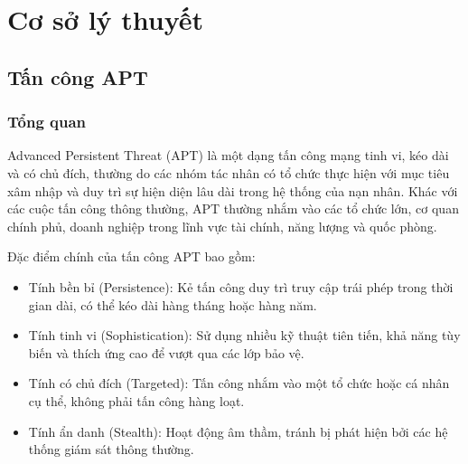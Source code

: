 \pagebreak

\chapter{Cơ sở lý thuyết}

\section{Tấn công APT}
\label{sec:apt}

\subsection{Tổng quan}
Advanced Persistent Threat (APT) là một dạng tấn công mạng tinh vi, kéo dài và có chủ đích, thường do các nhóm tác nhân có tổ chức thực hiện với mục tiêu xâm nhập và duy trì sự hiện diện lâu dài trong hệ thống của nạn nhân. Khác với các cuộc tấn công thông thường, APT thường nhắm vào các tổ chức lớn, cơ quan chính phủ, doanh nghiệp trong lĩnh vực tài chính, năng lượng và quốc phòng.

Đặc điểm chính của tấn công APT bao gồm:
\begin{itemize}
    \item Tính bền bỉ (Persistence): Kẻ tấn công duy trì truy cập trái phép trong thời gian dài, có thể kéo dài hàng tháng hoặc hàng năm.
    \item Tính tinh vi (Sophistication): Sử dụng nhiều kỹ thuật tiên tiến, khả năng tùy biến và thích ứng cao để vượt qua các lớp bảo vệ.
    \item Tính có chủ đích (Targeted): Tấn công nhắm vào một tổ chức hoặc cá nhân cụ thể, không phải tấn công hàng loạt.
    \item Tính ẩn danh (Stealth): Hoạt động âm thầm, tránh bị phát hiện bởi các hệ thống giám sát thông thường.
\end{itemize}

